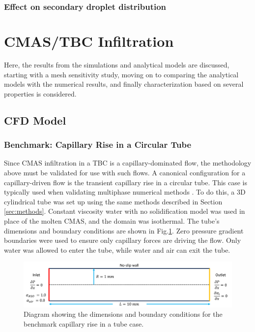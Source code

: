 \documentclass{UCF_ETD}
\begin{document}
\subsubsection{Effect on secondary droplet distribution}



\section{CMAS/TBC Infiltration}
Here, the results from the simulations and analytical models are discussed, starting with a mesh sensitivity study, moving on to comparing the analytical models with the numerical results, and finally characterization based on several properties is considered.

\subsection{CFD Model}
\subsubsection{Benchmark: Capillary Rise in a Circular Tube}

Since CMAS infiltration in a TBC is a capillary-dominated flow, the methodology above must be validated for use with such flows.
A canonical configuration for a capillary-driven flow is the transient capillary rise in a circular tube.
This case is typically used when validating multiphase numerical methods \cite{GRUNDING2020142, Shiri2022}. 
To do this, a 3D cylindrical tube was set up using the same methods described in Section \ref{sec:methods}.
Constant viscosity water with no solidification model was used in place of the molten CMAS, and the domain was isothermal.
The tube's dimensions and boundary conditions are shown in Fig.\ref{fig:benchmark_diagram}. Zero pressure gradient boundaries were used to ensure only capillary forces are driving the flow. Only water was allowed to enter the tube, while water and air can exit the tube.

\begin{figure}
    \centering
    \includegraphics[width=\linewidth]{Figures/capillaryRiseDiagram.png}
    \caption{Diagram showing the dimensions and boundary conditions for the benchmark capillary rise in a tube case.}
    \label{fig:benchmark_diagram}
\end{figure}
\end{document}
